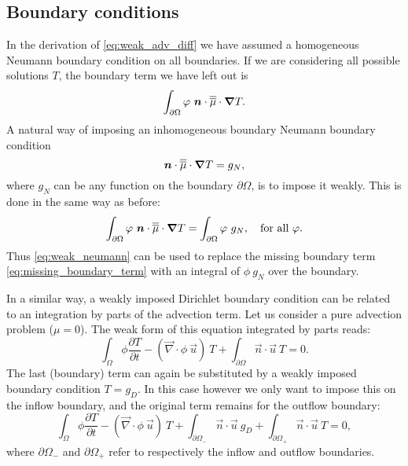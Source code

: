 \subsection{Boundary conditions}
In the derivation of \eqref{eq:weak_adv_diff} we have assumed a homogeneous Neumann 
boundary condition on all boundaries. If we are considering all possible 
solutions $T$, the boundary term we have left out is
\begin{equation}\label{eq:missing_boundary_term}
  \int_{\partial\Omega} \varphi~{\mbox{\boldmath$n$}}\cdot\overline{\overline{\mu}}\cdot{\mbox{\boldmath$\nabla$}} T.
\end{equation}
A natural way of imposing an inhomogeneous boundary Neumann boundary condition
\begin{equation*}
  {\mbox{\boldmath$n$}}\cdot\overline{\overline{\mu}}\cdot{\mbox{\boldmath$\nabla$}} T=g_N,
\end{equation*}
where $g_N$ can be any function on the boundary $\partial\Omega$, is to impose it 
weakly. This is done in the same way as before:
\begin{equation}\label{eq:weak_neumann}
  \int_{\partial\Omega} \varphi~{\mbox{\boldmath$n$}}\cdot\overline{\overline{\mu}}\cdot{\mbox{\boldmath$\nabla$}} T=
    \int_{\partial\Omega} \varphi~g_N, \quad \text{for all }\varphi.
\end{equation}
Thus \eqref{eq:weak_neumann} can be used to replace the missing 
boundary term \eqref{eq:missing_boundary_term} with an integral of $\phi~g_N$ 
over the boundary.

In a similar way, a weakly imposed Dirichlet boundary condition can be related to an 
integration by parts of the advection term. Let us consider a pure advection problem 
($\mu=0$). The weak form of this equation integrated by parts reads:
\begin{equation*}
  \int_\Omega \phi \frac{\partial T}{\partial t} -
    \left(\vec{\nabla}\cdot \phi~\vec{u}\right)~T +
    \int_{\partial\Omega} \vec{n}\cdot\vec{u}~T
    = 0.
\end{equation*}
The last (boundary) term can again be substituted by a weakly imposed
boundary condition $T=g_D$.  In this case however we only want to impose
this on the inflow boundary, and the original term remains for the outflow
boundary:
\begin{equation}\label{eq:adv_integrated_by_parts}  
  \int_\Omega \phi \frac{\partial T}{\partial t} -
    \left(\vec{\nabla}\cdot \phi~\vec{u}\right)~T +
    \int_{\partial\Omega_-} \vec{n}\cdot\vec{u}~g_D +
    \int_{\partial\Omega_+} \vec{n}\cdot\vec{u}~T
    = 0,
\end{equation}
where $\partial\Omega_-$ and $\partial\Omega_+$ refer to respectively 
the inflow and outflow boundaries.

